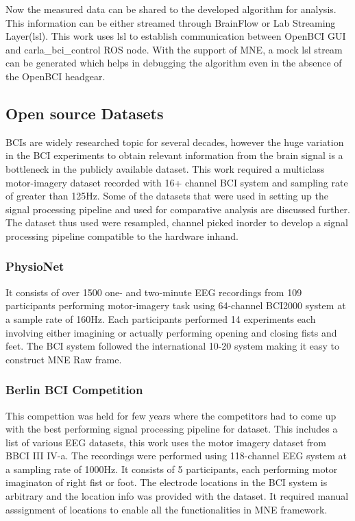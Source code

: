     Now the measured data can be shared to the developed algorithm for analysis. This information can be either streamed through BrainFlow or Lab Streaming Layer(lsl). This work
uses lsl to establish communication between OpenBCI GUI and carla_bci_control ROS node. With the support of MNE, a mock lsl stream can be generated which helps in debugging the
algorithm even in the absence of the OpenBCI headgear.

\subsection{Open source Datasets}
    BCIs are widely researched topic for several decades, however the huge variation in the BCI experiments to obtain relevant information from the brain signal is a bottleneck
in the publicly available dataset. This work required a multiclass motor-imagery dataset recorded with 16+ channel BCI system and sampling rate of greater than 125Hz. Some of the
datasets that were used in setting up the signal processing pipeline and used for comparative analysis are discussed further. The dataset thus used were resampled, channel picked
inorder to develop a signal processing pipeline compatible to the hardware inhand.

\subsubsection{PhysioNet}
    It consists of over 1500 one- and two-minute EEG recordings from 109 participants performing motor-imagery task using 64-channel BCI2000 system at a sample rate of 160Hz.
Each participants performed 14 experiments each involving either imagining or actually performing opening and closing fists and feet. The BCI system followed the international
10-20 system making it easy to construct MNE Raw frame.

\subsubsection{Berlin BCI Competition}
    This compettion was held for few years where the competitors had to come up with the best performing signal processing pipeline for dataset. This includes a list of various
EEG datasets, this work uses the motor imagery dataset from BBCI III IV-a. The recordings were performed using 118-channel EEG system at a sampling rate of 1000Hz. It consists
of 5 participants, each performing motor imaginaton of right fist or foot. The electrode locations in the BCI system is arbitrary and the location info was provided with the dataset.
It required manual asssignment of locations to enable all the functionalities in MNE framework.

